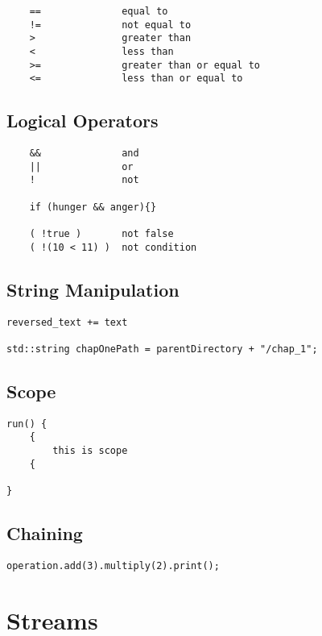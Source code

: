 \begin{verbatim}
    ==              equal to
    !=              not equal to
    >               greater than
    <               less than
    >=              greater than or equal to
    <=              less than or equal to
\end{verbatim}

\subsection{Logical Operators}

\begin{verbatim}
    &&              and 
    ||              or
    !               not

    if (hunger && anger){}

    ( !true )       not false
    ( !(10 < 11) )  not condition 
\end{verbatim}

\subsection{String Manipulation}

\begin{verbatim}
reversed_text += text

std::string chapOnePath = parentDirectory + "/chap_1";
\end{verbatim}

\subsection{Scope}

\begin{verbatim}
run() {
    {
        this is scope
    {
    
}
\end{verbatim}

\subsection{Chaining}

\begin{verbatim}
operation.add(3).multiply(2).print();
\end{verbatim}

\section{Streams} 

